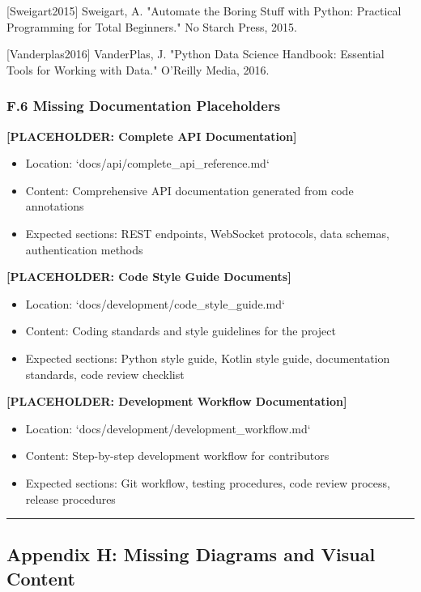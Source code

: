 \documentclass[12pt,a4paper]{article}
\begin{document}
{{[Sweigart2015] Sweigart, A. "Automate the Boring Stuff with Python: Practical Programming for Total Beginners." No
Starch Press, 2015.

[Vanderplas2016] VanderPlas, J. "Python Data Science Handbook: Essential Tools for Working with Data." O'Reilly Media,
2016.

\subsubsection{F.6 Missing Documentation Placeholders}

\textbf{[PLACEHOLDER: Complete API Documentation]}

\begin{itemize}
\item Location: `docs/api/complete_api_reference.md`
\item Content: Comprehensive API documentation generated from code annotations
\item Expected sections: REST endpoints, WebSocket protocols, data schemas, authentication methods

\end{itemize}
\textbf{[PLACEHOLDER: Code Style Guide Documents]}

\begin{itemize}
\item Location: `docs/development/code_style_guide.md`
\item Content: Coding standards and style guidelines for the project
\item Expected sections: Python style guide, Kotlin style guide, documentation standards, code review checklist

\end{itemize}
\textbf{[PLACEHOLDER: Development Workflow Documentation]}

\begin{itemize}
\item Location: `docs/development/development_workflow.md`
\item Content: Step-by-step development workflow for contributors
\item Expected sections: Git workflow, testing procedures, code review process, release procedures

\end{itemize}
\hrule

\subsection{Appendix H: Missing Diagrams and Visual Content}

}}
\end{document}
